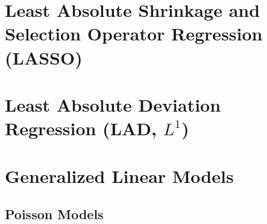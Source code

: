 \section{Least Absolute Shrinkage and Selection Operator Regression (LASSO)}


\section{Least Absolute Deviation Regression (LAD, $L^1$)}


\section{Generalized Linear Models}

\subsection{Poisson Models}




\chapauthor{}

